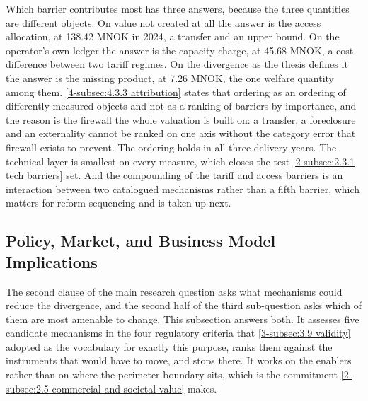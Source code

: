 Which barrier contributes most has three answers, because the three quantities are different objects. On value not created at all the answer is the access allocation, at 138.42 MNOK in 2024, a transfer and an upper bound. On the operator's own ledger the answer is the capacity charge, at 45.68 MNOK, a cost difference between two tariff regimes. On the divergence as the thesis defines it the answer is the missing product, at 7.26 MNOK, the one welfare quantity among them. \autoref{4-subsec:4.3.3 attribution} states that ordering as an ordering of differently measured objects and not as a ranking of barriers by importance, and the reason is the firewall the whole valuation is built on: a transfer, a foreclosure and an externality cannot be ranked on one axis without the category error that firewall exists to prevent. The ordering holds in all three delivery years. The technical layer is smallest on every measure, which closes the test \autoref{2-subsec:2.3.1 tech barriers} set. And the compounding of the tariff and access barriers is an interaction between two catalogued mechanisms rather than a fifth barrier, which matters for reform sequencing and is taken up next.

\subsection{Policy, Market, and Business Model Implications}
\label{5-subsec:5.3 implications}

The second clause of the main research question asks what mechanisms could reduce the divergence, and the second half of the third sub-question asks which of them are most amenable to change. This subsection answers both. It assesses five candidate mechanisms in the four regulatory criteria that \autoref{3-subsec:3.9 validity} adopted as the vocabulary for exactly this purpose, ranks them against the instruments that would have to move, and stops there. It works on the enablers rather than on where the perimeter boundary sits, which is the commitment \autoref{2-subsec:2.5 commercial and societal value} makes.

